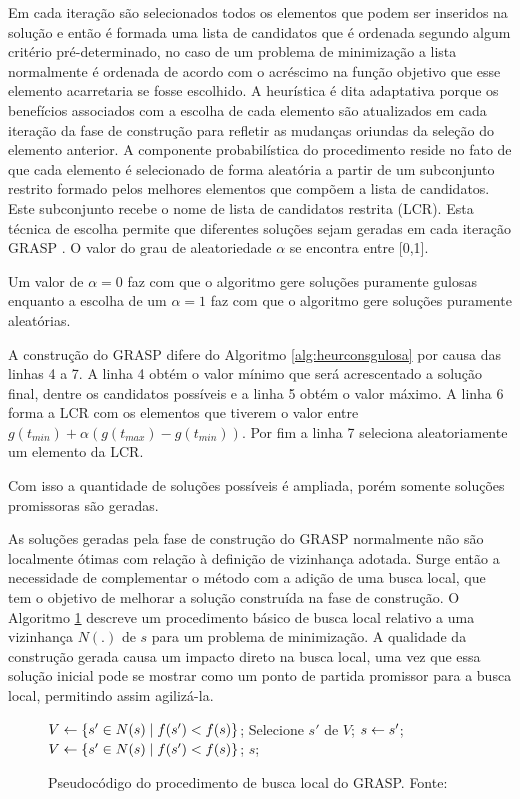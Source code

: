 Em cada iteração são selecionados todos os elementos que podem ser
inseridos na solução e então é formada uma lista de candidatos que é ordenada
segundo algum critério pré-determinado, no caso de um problema de
minimização a lista normalmente é ordenada de acordo com o acréscimo na função
objetivo que esse elemento acarretaria se fosse escolhido. A
heurística é dita adaptativa porque os benefícios associados com a escolha de
cada elemento são atualizados em cada iteração da fase de construção para
refletir as mudanças oriundas da seleção do elemento anterior. A componente
probabilística do procedimento reside no fato de que cada elemento é
selecionado de forma aleatória a partir de um subconjunto restrito formado
pelos melhores elementos que compõem a lista de candidatos. Este subconjunto
recebe o nome de lista de candidatos restrita (LCR). Esta técnica de escolha
permite que diferentes soluções sejam geradas em cada iteração GRASP
\cite{notasmarcone}. O valor do grau de aleatoriedade $\alpha$ se encontra
entre [0,1].

Um valor de $\alpha = 0$ faz com que o algoritmo gere soluções puramente
gulosas enquanto a escolha de um $\alpha = 1$ faz com que o algoritmo gere
soluções puramente aleatórias.
 
A construção do GRASP difere do Algoritmo \ref{alg:heurconsgulosa} por causa
das linhas 4 a 7. A linha 4 obtém o valor mínimo que será acrescentado a
solução final, dentre os candidatos possíveis e a linha 5 obtém o valor máximo.
A linha 6 forma a LCR com os elementos que tiverem o valor entre $g(t_{min}) +
\alpha(g(t_{max}) - g(t_{min}))$. Por fim a linha 7 seleciona aleatoriamente um
elemento da LCR.

Com isso a quantidade de soluções possíveis é ampliada, porém somente soluções
promissoras são geradas.

As soluções geradas pela fase de construção do GRASP normalmente não são
localmente ótimas com relação à definição de vizinhança adotada. Surge então a
necessidade de complementar o método com a adição de uma busca local, que tem
o objetivo de melhorar a solução construída na fase de construção. O Algoritmo
\ref{alg:grasplocal} descreve um procedimento básico de busca local relativo a
uma vizinhança $N(.)$ de $s$ para um problema de minimização. A qualidade da
construção gerada causa um impacto direto na busca local, uma vez que essa
solução inicial pode se mostrar como um ponto de partida promissor para a busca
local, permitindo assim agilizá-la.
 
\begin{figure}[h]
\caption{Pseudocódigo do procedimento de busca local do GRASP. \newline
\mbox{Fonte:
\cite{resende1995}}}\label{alg:grasplocal}
\begin{programma}
\STATE $V \leftarrow \{s{'} \in N(s) \mid f(s{'}) < f(s)\}$;
\STATE Selecione $s{'}$ de $V$;
\STATE $s \leftarrow s{'}$;
\STATE $V \leftarrow \{s{'} \in N(s) \mid f(s{'}) < f(s)\}$;
\ENDWHILE
\STATE\RETURN $s$;
\ENDALGORITHM
\end{programma}
\end{figure}

